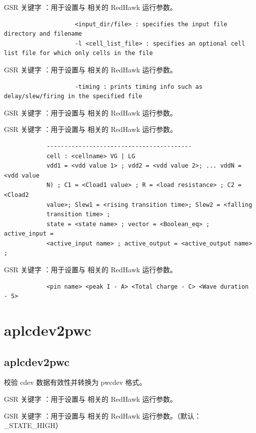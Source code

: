 GSR 关键字 ：用于设置与  相关的 RedHawk 运行参数。

\begin{lstlisting}
                    <input_dir/file> : specifies the input file directory and filename
                    -l <cell_list_file> : specifies an optional cell list file for which only cells in the file
\end{lstlisting}

GSR 关键字 ：用于设置与  相关的 RedHawk 运行参数。

\begin{lstlisting}
                    -timing : prints timing info such as delay/slew/firing in the specified file
\end{lstlisting}

GSR 关键字 ：用于设置与  相关的 RedHawk 运行参数。

GSR 关键字 ：用于设置与  相关的 RedHawk 运行参数。

\begin{lstlisting}
            -----------------------------------------
            cell : <cellname> VG | LG
            vdd1 = <vdd value 1> ; vdd2 = <vdd value 2>; ... vddN = <vdd value
            N) ; C1 = <Cload1 value> ; R = <load resistance> ; C2 = <Cload2
            value>; Slew1 = <rising transition time>; Slew2 = <falling
            transition time> ;
            state = <state name> ; vector = <Boolean_eq> ; active_input =
            <active_input name> ; active_output = <active_output name> ;
\end{lstlisting}

GSR 关键字 ：用于设置与  相关的 RedHawk 运行参数。

\begin{lstlisting}
            <pin name> <peak I - A> <Total charge - C> <Wave duration - S>
\end{lstlisting}

\section{aplcdev2pwc}
\subsection*{aplcdev2pwc}

校验 cdev 数据有效性并转换为 pwcdev 格式。

GSR 关键字 ：用于设置与  相关的 RedHawk 运行参数。

GSR 关键字 ：用于设置与  相关的 RedHawk 运行参数。（默认：_STATE_HIGH）

